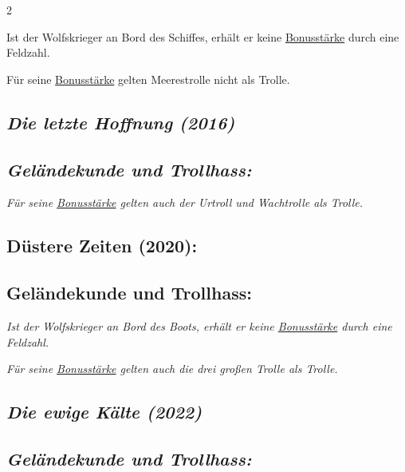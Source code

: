 \documentclass[10pt, a4paper, oneside]{book}
\newcommand{\fan}[1]{\textit{#1}}
\begin{document}
\begin{multicols*}{2}
\begin{bgcolor}
Ist der Wolfskrieger an Bord des Schiffes, erhält er keine \hyperref[bonusstaerke]{Bonusstärke} durch eine Feldzahl.

Für seine \hyperref[bonusstaerke]{Bonusstärke} gelten Meerestrolle nicht als Trolle.
\supercite{10469}

\end{bgcolor}


\begin{bgcolor}
\section{\fan{Die letzte Hoffnung (2016)}}

\subsection{\fan{Geländekunde und Trollhass:}}

\fan{Für seine \hyperref[bonusstaerke]{Bonusstärke} gelten auch der Urtroll und Wachtrolle als Trolle.}

\end{bgcolor}



\begin{bgcolor}[color-dz]
\section{Düstere Zeiten (2020):}

\subsection{Geländekunde und Trollhass:}


\fan{Ist der Wolfskrieger an Bord des Boots, erhält er keine \hyperref[bonusstaerke]{Bonusstärke} durch eine Feldzahl.}

\fan{Für seine \hyperref[bonusstaerke]{Bonusstärke} gelten auch die drei großen Trolle als Trolle.}

\end{bgcolor}



\begin{bgcolor}
\section{\fan{Die ewige Kälte (2022)}}

\subsection{\fan{Geländekunde und Trollhass:}}


\end{bgcolor}
\end{multicols*}
\end{document}
